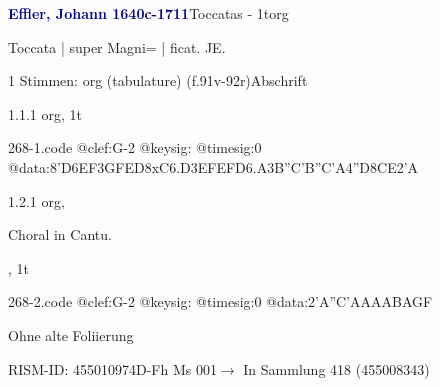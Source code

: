 \documentclass[twocolumn]{book}
\begin{document}
\par \vspace{7pt} \textcolor{darkblue}{\textbf{Effler, Johann  1640c-1711}}\hfillplus{\textbf{[268]}}\newline Toccatas - 1t\newline org
\par \begin{itshape}[f.91v, at left:] Toccata | super Magni= | ficat. JE.\end{itshape} 
\par \textcolor{darkblue}{}  1 Stimmen: org (tabulature)  (f.91v-92r)\newline Abschrift
\par 1.1.1  org, 1t  
\begin{filecontents*}{268-1.code}
@clef:G-2
@keysig:
@timesig:0
@data:{8'D6EF}{3GFED}8xC{6.D3E}{FEFD}{6.A3B}{''C'B''C'A}4''D{8CE}2'A
\end{filecontents*}
\newline
%
\par 1.2.1  org, \begin{itshape}Choral in Cantu.\end{itshape}, 1t  
\begin{filecontents*}{268-2.code}
@clef:G-2
@keysig:
@timesig:0
@data:2'A''C'AAAABAGF
\end{filecontents*}
\newline
%
\par Ohne alte Foliierung
\par RISM-ID: 455010974\newline D-Fh  Ms 001\newline $\rightarrow$ In Sammlung 418 (455008343)
      
\end{document}
